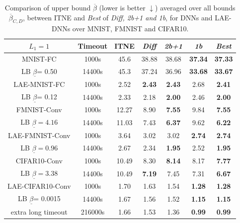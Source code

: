 \begin{table}[b!]
	\centering
	\begin{tabular}{|cc| c | c c c|c|}\hline
		$L_1=1$ & Timeout & ITNE & {\em Diff} & {\em 2b+1} & {\em 1b} & {\em Best} \\\hline \hline 
		MNIST-FC  & 1000s & 45.6 & 38.88 & 38.68 & {\bf 37.34} & {\bf 37.33}
		\\
		LB $\underline{\beta}$= 0.50 & 14400s & 45.3 & 37.24 & 36.96 & {\bf 33.68} & {\bf 33.67}
		
		\\\hline
		LAE-MNIST-FC  & 1000s & 2.52 & {\bf 2.43} & {\bf 2.43} & 2.68 & {\bf 2.41}
		\\
		LB $\underline{\beta}$= 0.12 & 14400s & 2.33 & 2.18 & {\bf 2.00} & 2.46 & {\bf 2.00}
		\\ \hline \hline
		
 		FMNIST-Conv & 1000s & 12.27 & 8.90 & {\bf 7.55} & 9.84 & {\bf 7.55}
		\\
		LB $\underline{\beta} = 4.16$ & 14400s & 11.03 & 7.43 & {\bf 6.37} & 9.62 & {\bf 6.22}
		\\\hline

		LAE-FMNIST-Conv & 1000s & 3.64 & 3.02 & 3.02 & {\bf 2.74} & {\bf 2.74}
		\\
		LB $\underline{\beta}= 0.96$ & 14400s & 2.67 & 2.34  & {\bf 1.95} & 2.52 & {\bf 1.95}
		\\\hline  \hline
		
		
		
		CIFAR10-Conv  & 1000s & 10.49 &8.30 & {\bf 8.14} & 8.17 & {\bf 7.77}
		\\
		LB $\underline{\beta}= 3.38$ & 14400s & 10.49 & {\bf 7.19} & 7.45 & 7.31 & {\bf 6.67}
		\\\hline
		LAE-CIFAR10-Conv  & 1000s & 1.70 & 1.63 & 1.54 & {\bf 1.28} & {\bf 1.28}
		\\
		LB $\underline{\beta}$= 0.0015 & 14400s & 1.67 & 1.56 & 1.52 & {\bf 1.15} & {\bf 1.15}
		\\
		 extra long timeout& 216000s & 1.66 & 1.53 & 1.36 & {\bf 0.99} & {\bf 0.99}
		
		\\\hline

	\end{tabular}
	\caption{Comparison of upper bound $\overline{\beta}$ (lower is better $\downarrow$) averaged over all bounds $\overline{\beta}_{C,D}$,
	between ITNE and {\em Best} of {\em Diff, 2b+1 and 1b}, for DNNs and LAE-DNNs over MNIST, FMNIST and CIFAR10. %
	 }
	\label{table.L1}
\end{table}




